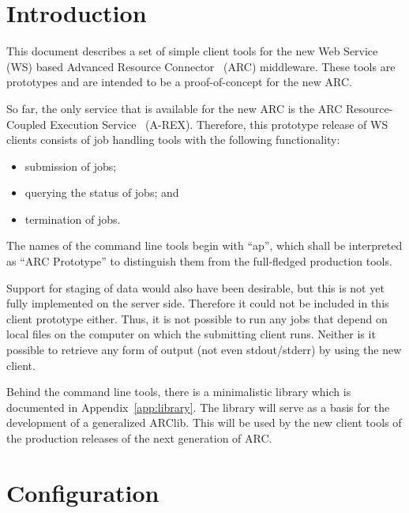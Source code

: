 \documentclass{article}                            %
\begin{document}
\tableofcontents                          %
\newpage
\section{Introduction}                    %
\label{sec:intro}

This document describes a set of simple client tools for the new Web
Service~\cite{ws} (WS) based Advanced Resource Connector~\cite{arc}
(ARC) middleware. These tools are prototypes and are intended to be a
proof-of-concept for the new ARC.

So far, the only service that is available for the new ARC is the ARC
Resource-Coupled Execution Service~\cite{arex} (A-REX). Therefore,
this prototype release of WS clients consists of job handling tools
with the following functionality:
\begin{itemize}
\item submission of jobs;
\item querying the status of jobs; and
\item termination of jobs.
\end{itemize}

The names of the command line tools begin with ``ap'', which shall be
interpreted as ``ARC Prototype'' to distinguish them from the
full-fledged production tools.

Support for staging of data would also have been desirable, but this
is not yet fully implemented on the server side. Therefore it could
not be included in this client prototype either. Thus, it is not
possible to run any jobs that depend on local files on the computer on
which the submitting client runs. Neither is it possible to retrieve
any form of output (not even stdout/stderr) by using the new client.

Behind the command line tools, there is a minimalistic library which
is documented in Appendix~\ref{app:library}. The library will serve as
a basis for the development of a generalized ARClib. This will be used
by the new client tools of the production releases of the next
generation of ARC.


\section{Configuration}
\label{sec:config}
\end{document}
